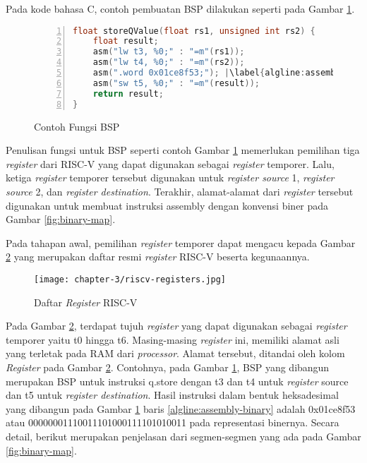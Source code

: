 Pada kode bahasa C, contoh pembuatan \ac{BSP} dilakukan seperti pada Gambar \ref{fig:bsp-example}.

\begin{figure}[H]
	\centering
	\begin{lstlisting}[language=C,escapechar=|,numbers=left]
float storeQValue(float rs1, unsigned int rs2) {
	float result;
	asm("lw t3, %0;" : "=m"(rs1));
	asm("lw t4, %0;" : "=m"(rs2));
	asm(".word 0x01ce8f53;"); |\label{algline:assembly-binary}|
	asm("sw t5, %0;" : "=m"(result)); 
	return result;
}
\end{lstlisting}
	\caption{Contoh Fungsi \ac{BSP}}
	\label{fig:bsp-example}
\end{figure}

Penulisan fungsi untuk \ac{BSP} seperti contoh Gambar \ref{fig:bsp-example} memerlukan pemilihan tiga \textit{register} dari RISC-V yang dapat digunakan sebagai \textit{register} temporer. Lalu, ketiga \textit{register} temporer tersebut digunakan untuk \textit{register source} 1, \textit{register source} 2, dan \textit{register destination}. Terakhir, alamat-alamat dari \textit{register} tersebut digunakan untuk membuat instruksi assembly dengan konvensi biner pada Gambar \ref{fig:binary-map}.

Pada tahapan awal, pemilihan \textit{register} temporer dapat mengacu kepada Gambar \ref{fig:riscv-registers} yang merupakan daftar resmi \textit{register} RISC-V beserta kegunaannya.

\begin{figure}[H]
	\centering
	\texttt{[image: chapter-3/riscv-registers.jpg]}
	\caption{Daftar \textit{Register} RISC-V}
	\label{fig:riscv-registers}
\end{figure}

Pada Gambar \ref{fig:riscv-registers}, terdapat tujuh \textit{register} yang dapat digunakan sebagai \textit{register} temporer yaitu t0 hingga t6. Masing-masing \textit{register} ini, memiliki alamat asli yang terletak pada \ac{RAM} dari \textit{processor}. Alamat tersebut, ditandai oleh kolom \textit{Register} pada Gambar \ref{fig:riscv-registers}. Contohnya, pada Gambar \ref{fig:bsp-example}, \ac{BSP} yang dibangun merupakan \ac{BSP} untuk instruksi q.store dengan t3 dan t4 untuk \textit{register} source dan t5 untuk \textit{register destination}. Hasil instruksi dalam bentuk heksadesimal yang dibangun pada Gambar \ref{fig:bsp-example} baris \ref{algline:assembly-binary} adalah 0x01ce8f53 atau 00000001110011101000111101010011 pada representasi binernya. Secara detail, berikut merupakan penjelasan dari segmen-segmen yang ada pada Gambar \ref{fig:binary-map}.

